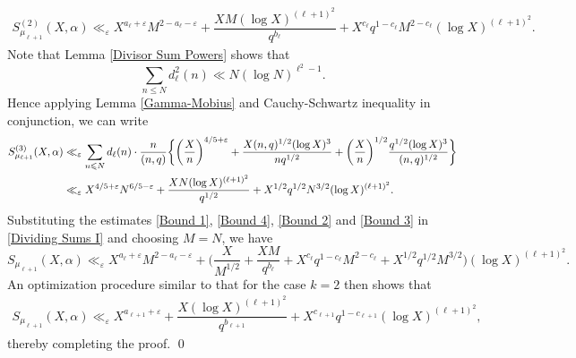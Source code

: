 \documentclass[11pt]{amsart}
\numberwithin{equation}{section}
\numberwithin{figure}{section}
\theoremstyle{definition}
\begin{document}
\begin{align}
    S_{\mu _{\ell+1} }^{(2)}(X, \alpha) 
    \ll_{\varepsilon} X^{a_\ell+\varepsilon}M^{2-a_\ell-\varepsilon}+ \dfrac{XM(\log X)^{(\ell+1)^2}}{q^{b_\ell}} + X^{c _\ell}q^{1-c _\ell}M^{2-c_\ell}(\log X)^{(\ell+1)^2}. \label{Bound 2}
\end{align}
Note that Lemma \ref{Divisor Sum Powers} shows that
\[ \sum_{n \leqslant N } d _\ell^2(n) \ll N(\log N)^{\ell^2-1}.\]
Hence applying Lemma \eqref{Gamma-Mobius} and Cauchy-Schwartz inequality in conjunction, we can write
\begin{align}\label{Bound 3}
S_{\mu _{\ell+1} }^{(3)}(X, \alpha) &\ll_{\varepsilon} \sum_{n \leqslant N } d_\ell(n) \cdot \dfrac{n}{(n, q)}\bigg\{\bigg(\dfrac{X}{n}\bigg)^{4/5+\varepsilon} + \dfrac{X(n, q)^{1/2}(\log X)^3}{nq^{1/2}} + \bigg(\dfrac{X}{n}\bigg)^{1/2}\dfrac{q^{1/2}(\log X)^3}{(n, q)^{1/2}}\bigg\} \notag \\
&\ll_{\varepsilon}X^{4/5+\varepsilon}N^{6/5-\varepsilon}+ \dfrac{XN(\log X)^{(\ell+1)^2}}{q^{1/2}} + X^{1/2}q^{1/2}N^{3/2}(\log X)^{(\ell+1)^2}.
\end{align}
Substituting the estimates \eqref{Bound 1}, \eqref{Bound 4}, \eqref{Bound 2} and \eqref{Bound 3} in \eqref{Dividing Sums I} and choosing $M=N$, we have
\begin{equation*}
S_{\mu _{\ell+1} }(X, \alpha) \ll_{\varepsilon} X^{a _\ell+\varepsilon}M^{2-a _\ell-\varepsilon}+ \bigg(\dfrac{X}{M^{1/2}} +\dfrac{XM}{q^{b _\ell}} + X^{c _\ell}q^{1-c _\ell}M^{2-c _\ell} + X^{1/2}q^{1/2}M^{3/2}\bigg)(\log X)^{(\ell+1)^2}.
\end{equation*}
An optimization procedure similar to that for the case $k=2$ then shows that
\begin{align*}
S_{\mu _{\ell+1} }(X, \alpha) \ll_{\varepsilon}  X^{a _{\ell+1}+\varepsilon}+\dfrac{X(\log X)^{(\ell+1)^2}}{q^{b _{\ell+1}}} + X^{c _{\ell+1}}q^{1-c _{\ell+1}}(\log X)^{(\ell+1)^2},
\end{align*}
thereby completing the proof.
\qed
\end{document}
